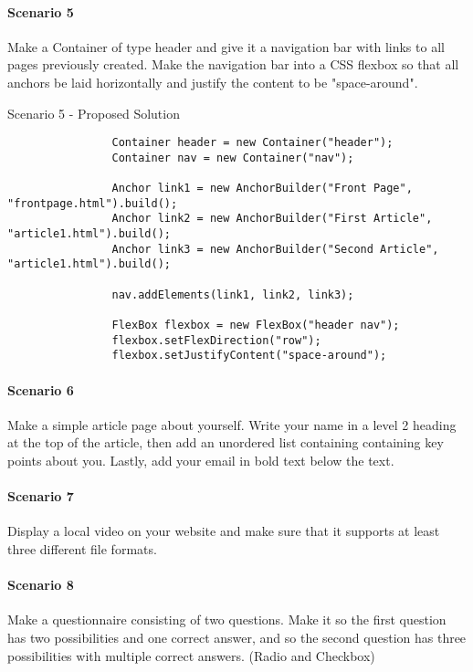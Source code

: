 \documentclass[12pt]{article}
\begin{document}
        \paragraph{Scenario 5}
        Make a Container of type header and give it a navigation bar with links to all pages previously created. Make the navigation bar into a CSS flexbox so that all anchors be laid horizontally and justify the content to be "space-around".

        \begin{shaded}
            Scenario 5 - Proposed Solution
            \begin{lstlisting}
                Container header = new Container("header");
                Container nav = new Container("nav");

                Anchor link1 = new AnchorBuilder("Front Page", "frontpage.html").build();
                Anchor link2 = new AnchorBuilder("First Article", "article1.html").build();
                Anchor link3 = new AnchorBuilder("Second Article", "article1.html").build();

                nav.addElements(link1, link2, link3);

                FlexBox flexbox = new FlexBox("header nav");
                flexbox.setFlexDirection("row");
                flexbox.setJustifyContent("space-around");
            \end{lstlisting}
        \end{shaded}

        \paragraph{Scenario 6}
        Make a simple article page about yourself. Write your name in a level 2 heading at the top of the article, then add an unordered list containing containing key points about you. Lastly, add your email in bold text below the text.

        \paragraph{Scenario 7}
        Display a local video on your website and make sure that it supports at least three different file formats.

        \paragraph{Scenario 8}
        Make a questionnaire consisting of two questions. Make it so the first question has two possibilities and one correct answer, and so the second question has three possibilities with multiple correct answers. (Radio and Checkbox)
\end{document}
